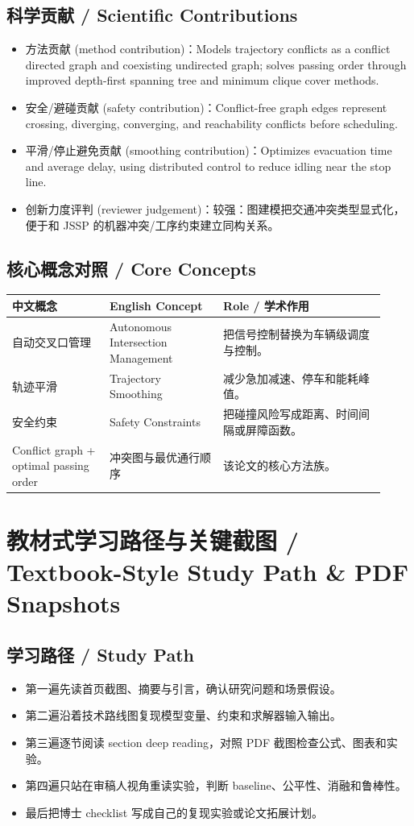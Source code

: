\documentclass[UTF8,a4paper,11pt,fontset=fandol]{ctexart}
\begin{document}
\subsection{科学贡献 / Scientific Contributions}
\begin{itemize}
\item 方法贡献 (method contribution)：Models trajectory conflicts as a conflict directed graph and coexisting undirected graph; solves passing order through improved depth-first spanning tree and minimum clique cover methods.
\item 安全/避碰贡献 (safety contribution)：Conflict-free graph edges represent crossing, diverging, converging, and reachability conflicts before scheduling.
\item 平滑/停止避免贡献 (smoothing contribution)：Optimizes evacuation time and average delay, using distributed control to reduce idling near the stop line.
\item 创新力度评判 (reviewer judgement)：较强：图建模把交通冲突类型显式化，便于和 JSSP 的机器冲突/工序约束建立同构关系。
\end{itemize}


\subsection{核心概念对照 / Core Concepts}
\begin{longtable}{p{0.24\linewidth}p{0.28\linewidth}p{0.40\linewidth}}
\toprule
中文概念 & English Concept & Role / 学术作用\\
\midrule
自动交叉口管理 & Autonomous Intersection Management & 把信号控制替换为车辆级调度与控制。 \\
轨迹平滑 & Trajectory Smoothing & 减少急加减速、停车和能耗峰值。 \\
安全约束 & Safety Constraints & 把碰撞风险写成距离、时间间隔或屏障函数。 \\
Conflict graph + optimal passing order & 冲突图与最优通行顺序 & 该论文的核心方法族。 \\
\bottomrule
\end{longtable}

\section{教材式学习路径与关键截图 / Textbook-Style Study Path \& PDF Snapshots}
\subsection{学习路径 / Study Path}
\begin{itemize}
\item 第一遍先读首页截图、摘要与引言，确认研究问题和场景假设。
\item 第二遍沿着技术路线图复现模型变量、约束和求解器输入输出。
\item 第三遍逐节阅读 section deep reading，对照 PDF 截图检查公式、图表和实验。
\item 第四遍只站在审稿人视角重读实验，判断 baseline、公平性、消融和鲁棒性。
\item 最后把博士 checklist 写成自己的复现实验或论文拓展计划。
\end{itemize}
\end{document}
